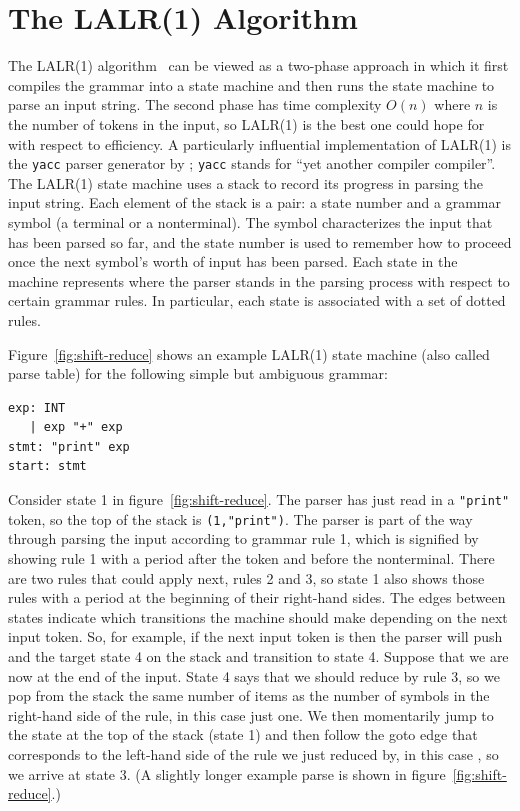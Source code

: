 \documentclass[7x10]{TimesAPriori_MIT}%
\numberwithin{theorem}{chapter}
\numberwithin{definition}{chapter}
\numberwithin{equation}{chapter}
\begin{document}
{\section{The LALR(1) Algorithm}
\label{sec:lalr}

The LALR(1) algorithm~\citep{DeRemer69,Anderson73} can be viewed as a
two-phase approach in which it first compiles the grammar into a state
machine and then runs the state machine to parse an input string.  The
second phase has time complexity $O(n)$ where $n$ is the number of
tokens in the input, so LALR(1) is the best one could hope for with
respect to efficiency.
%
A particularly influential implementation of LALR(1) is the
\texttt{yacc} parser generator by \citet{Johnson:1979qy};
\texttt{yacc} stands for ``yet another compiler compiler''.
%
The LALR(1) state machine uses a stack to record its progress in
parsing the input string.  Each element of the stack is a pair: a
state number and a grammar symbol (a terminal or a nonterminal). The
symbol characterizes the input that has been parsed so far, and the
state number is used to remember how to proceed once the next
symbol's worth of input has been parsed.  Each state in the machine
represents where the parser stands in the parsing process with respect
to certain grammar rules. In particular, each state is associated with
a set of dotted rules.

Figure~\ref{fig:shift-reduce} shows an example LALR(1) state machine
(also called parse table) for the following simple but ambiguous
grammar:
\begin{lstlisting}[escapechar=$]
exp: INT
   | exp "+" exp
stmt: "print" exp
start: stmt
\end{lstlisting}
Consider state 1 in figure~\ref{fig:shift-reduce}. The parser has just
read in a \lstinline{"print"} token, so the top of the stack is
\lstinline{(1,"print")}. The parser is part of the way through parsing
the input according to grammar rule 1, which is signified by showing
rule 1 with a period after the  token and before the
 nonterminal. There are two rules that could apply next,
rules 2 and 3, so state 1 also shows those rules with a period at
the beginning of their right-hand sides. The edges between states
indicate which transitions the machine should make depending on the
next input token. So, for example, if the next input token is
 then the parser will push  and the target state 4
on the stack and transition to state 4.  Suppose that we are now at the end
of the input. State 4 says that we should reduce by rule 3, so we pop
from the stack the same number of items as the number of symbols in
the right-hand side of the rule, in this case just one.  We then
momentarily jump to the state at the top of the stack (state 1) and
then follow the goto edge that corresponds to the left-hand side of
the rule we just reduced by, in this case , so we arrive at
state 3.  (A slightly longer example parse is shown in
figure~\ref{fig:shift-reduce}.)

}
\end{document}

